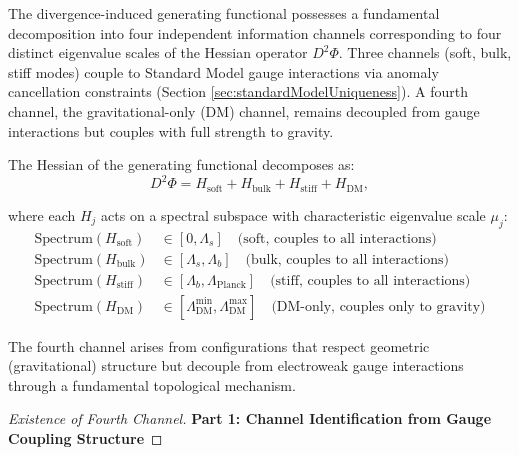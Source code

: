 \begin{theorem}
\label{thm:darkMatterFourthChannel}

The divergence-induced generating functional possesses a fundamental decomposition into four independent information channels corresponding to four distinct eigenvalue scales of the Hessian operator $D^2\Phi$. Three channels (soft, bulk, stiff modes) couple to Standard Model gauge interactions via anomaly cancellation constraints (Section \ref{sec:standardModelUniqueness}). A fourth channel, the gravitational-only (DM) channel, remains decoupled from gauge interactions but couples with full strength to gravity.

\begin{definition}
\label{def:fourChannelDecomposition}

The Hessian of the generating functional decomposes as:
\begin{equation}
D^2\Phi = H_{\text{soft}} + H_{\text{bulk}} + H_{\text{stiff}} + H_{\text{DM}},
\end{equation}

where each $H_j$ acts on a spectral subspace with characteristic eigenvalue scale $\mu_j$:
\begin{align}
\text{Spectrum}(H_{\text{soft}}) &\in [0, \Lambda_s] \quad \text{(soft, couples to all interactions)} \\
\text{Spectrum}(H_{\text{bulk}}) &\in [\Lambda_s, \Lambda_b] \quad \text{(bulk, couples to all interactions)} \\
\text{Spectrum}(H_{\text{stiff}}) &\in [\Lambda_b, \Lambda_{\text{Planck}}] \quad \text{(stiff, couples to all interactions)} \\
\text{Spectrum}(H_{\text{DM}}) &\in [\Lambda_{\text{DM}}^{\min}, \Lambda_{\text{DM}}^{\max}] \quad \text{(DM-only, couples only to gravity)}
\end{align}

The fourth channel arises from configurations that respect geometric (gravitational) structure but decouple from electroweak gauge interactions through a fundamental topological mechanism.

\end{definition}

\begin{proof}[Existence of Fourth Channel]

\textbf{Part 1: Channel Identification from Gauge Coupling Structure}


\end{proof}
\end{theorem}
